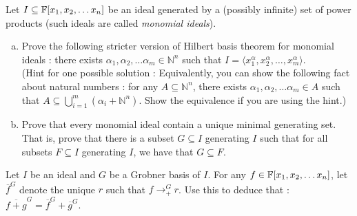 \begin{ps2}
	Let $I \subseteq {\mathbb{F}}[x_1, x_2, \ldots x_n]$ be an ideal generated by a (possibly infinite) set of power products (such ideals are called {\em monomial ideals}).
\begin{enumerate}[(a)]
\item Prove the following stricter version of Hilbert basis theorem for monomial ideals : there exists $\alpha_1, \alpha_2, \ldots \alpha_m \in \mathbb{N}^n$ such that $I = \langle x^\alpha_1, x^\alpha_2, \ldots, x^\alpha_m \rangle$.\\ (Hint for one possible solution : Equivalently, you can show the following fact about natural numbers : for any $A \subseteq \mathbb{N}^n$, there exists $\alpha_1, \alpha_2, \ldots \alpha_m \in A$ such that $A \subseteq \bigcup_{i=1}^m(\alpha_i + \mathbb{N}^n)$. Show the equivalence if you are using the hint.)
\item Prove that every monomial ideal contain a unique minimal generating set. That is, prove that there is a subset $G \subseteq I$ generating $I$ such that for all subsets $F \subseteq I$ generating $I$, we have that $G \subseteq F$.
\end{enumerate}
\end{ps2}

\begin{ps2}
Let $I$ be an ideal and $G$ be a Grobner basis of $I$. For any $f \in {\mathbb{F}}[x_1, x_2, \ldots x_n]$, let $\overline{f}^G$ denote the unique $r$ such that $f \rightarrow^G_{+} r$.
Use this to deduce that : $\overline{f+g}^G = \overline{f}^G + \overline{g}^G$.
\end{ps2}

